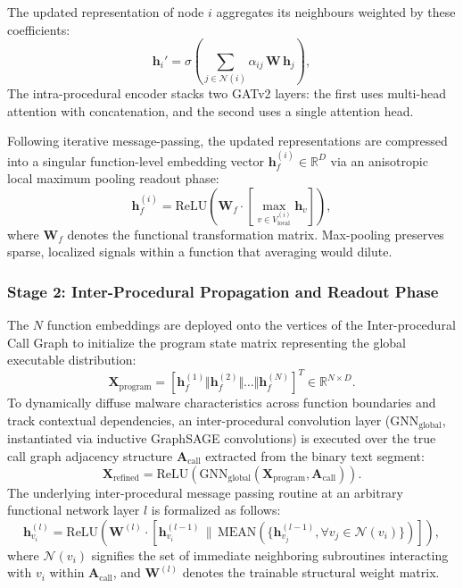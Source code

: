 \documentclass{llncs}
\begin{document}
The updated representation of node $i$ aggregates its neighbours weighted by these
coefficients:
\begin{equation}
\mathbf{h}_{i}' = \sigma\!\left( \sum_{j \in \mathcal{N}(i)} \alpha_{ij}\, \mathbf{W}\, \mathbf{h}_{j} \right),
\end{equation}
The intra-procedural encoder stacks two GATv2 layers: the first uses multi-head attention with
concatenation, and the second uses a single attention head.

Following iterative message-passing, the updated representations are compressed into a singular function-level embedding vector $\mathbf{h}_{f}^{(i)} \in \mathbb{R}^{D}$ via an anisotropic local maximum pooling readout phase:
\begin{equation}
\mathbf{h}_{f}^{(i)} = \mathrm{ReLU}\left(\mathbf{W}_{f} \cdot \left[ \max_{v \in V_{\text{local}}^{(i)}} \mathbf{h}_{v} \right] \right),
\end{equation}
where $\mathbf{W}_{f}$ denotes the functional transformation matrix. Max-pooling preserves sparse, localized signals within a function that averaging would dilute.

\subsubsection{Stage 2: Inter-Procedural Propagation and Readout Phase}
The $N$ function embeddings are deployed onto the vertices of the Inter-procedural Call Graph to initialize the program state matrix representing the global executable distribution:
\begin{equation}
\mathbf{X}_{\text{program}} = \left[ \mathbf{h}_{f}^{(1)} \Vert \mathbf{h}_{f}^{(2)} \Vert \dots \Vert \mathbf{h}_{f}^{(N)} \right]^{T} \in \mathbb{R}^{N \times D}.
\end{equation}
To dynamically diffuse malware characteristics across function boundaries and track contextual dependencies, an inter-procedural convolution layer ($\text{GNN}_{\text{global}}$, instantiated via inductive GraphSAGE convolutions) is executed over the true call graph adjacency structure $\mathbf{A}_{\text{call}}$ extracted from the binary text segment:
\begin{equation}
\mathbf{X}_{\text{refined}} = \mathrm{ReLU}\left( \text{GNN}_{\text{global}}(\mathbf{X}_{\text{program}}, \mathbf{A}_{\text{call}}) \right).
\end{equation}
The underlying inter-procedural message passing routine at an arbitrary functional network layer $l$ is formalized as follows:
\begin{equation}
\mathbf{h}_{v_i}^{(l)} = \text{ReLU} \left( \mathbf{W}^{(l)} \cdot \left[ \mathbf{h}_{v_i}^{(l-1)} \,\|\, \text{MEAN} \left( \{ \mathbf{h}_{v_j}^{(l-1)}, \forall v_j \in \mathcal{N}(v_i) \} \right) \right] \right),
\end{equation}
where $\mathcal{N}(v_i)$ signifies the set of immediate neighboring subroutines interacting with $v_i$ within $\mathbf{A}_{\text{call}}$, and $\mathbf{W}^{(l)}$ denotes the trainable structural weight matrix.
\end{document}
